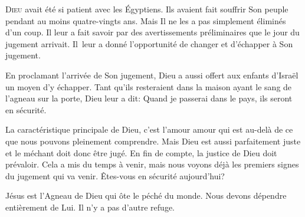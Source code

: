 


\lettrine{D}{ieu} avait été si patient avec les Égyptiens.
 Ils avaient fait souffrir Son peuple pendant au moins quatre-vingts ans.
 Mais Il ne les a pas simplement éliminés d'un coup.
 Il leur a fait savoir par des avertissements préliminaires
 que le jour du jugement arrivait.
 Il~leur a donné l'opportunité de changer et d'échapper à Son jugement.

En proclamant l'arrivée de Son jugement,
 Dieu a aussi offert aux enfants d'Israël un moyen d'y échapper.
 Tant qu'ils resteraient dans la maison ayant le sang de l'agneau sur la porte,
 Dieu leur a dit:
 \Og Quand je passerai dans le pays, ils seront en sécurité. \Fg{}

La caractéristique principale de Dieu, c'est l'amour
 \ocadr{}amour qui est au-delà de ce que nous pouvons pleinement comprendre.
 Mais Dieu est aussi parfaitement juste et le méchant doit donc être jugé.
 En fin de compte, la justice de Dieu doit prévaloir.
 Cela a mis du temps à venir, mais nous voyons déjà les premiers signes
 du jugement qui va venir.
 Êtes-vous en sécurité aujourd'hui?


Jésus est l'Agneau de Dieu qui ôte le péché du monde.
 Nous devons dépendre entièrement de Lui. Il n'y a pas d'autre refuge. 

\dvrule



